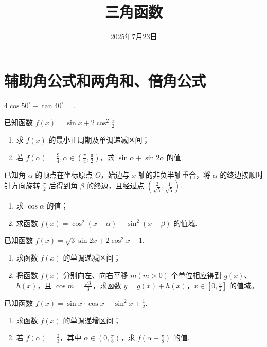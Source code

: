 \documentclass[a4paper , final]{ctexart}
\title{三角函数}
\date{2025年7月23日}
\newenvironment{problem}[1]{%
  \item #1
  \par
  \vspace{8cm}
}{}
\begin{document}
\maketitle

\section*{辅助角公式和两角和、倍角公式}

\begin{problems}
  \begin{problem}
        {
            $4\cos{50^\circ}-\tan{40^\circ}=$\underline{\hspace{1.5cm}}.
        }
    \end{problem}
  \begin{problem}
    {
      已知函数 $f(x) = \sin x +2\cos^2\frac{x}{2}$.
      \begin{enumerate}[label=(\arabic*)]
        \item 求 $f(x)$ 的最小正周期及单调递减区间；
        \item 若 $f(\alpha)=\frac94,\alpha\in(\frac{\pi}{4},\frac{\pi}{2})$，求 $\sin\alpha+\sin 2\alpha$ 的值.
      \end{enumerate}
    }
  \end{problem}

  \begin{problem}
    {
      已知角 $\alpha$ 的顶点在坐标原点 $O$，始边与 $x$ 轴的非负半轴重合，将 $\alpha$ 的终边按顺时针方向旋转 $\frac{\pi}{2}$ 后得到角 $\beta$ 的终边，且经过点 $(\frac{2}{\sqrt{5}}, \frac{1}{\sqrt{5}})$.
      \begin{enumerate}[label=(\arabic*)]
        \item 求 $\cos \alpha$ 的值；
        \item 求函数 $f(x) = \cos^2(x-\alpha) + \sin^2(x+\beta)$ 的值域.
      \end{enumerate}
    }
  \end{problem}

  \begin{problem}
    {
      已知函数 $f(x) = \sqrt{3} \sin 2x + 2\cos^2 x - 1$.
      \begin{enumerate}[label=(\arabic*)]
        \item 求函数 $f(x)$ 的单调递减区间；
        \item 将函数 $f(x)$ 分别向左、向右平移 $m(m>0)$ 个单位相应得到 $g(x)$、$h(x)$，且 $\cos m = \frac{\sqrt{3}}{3}  $，求函数 $y = g(x) + h(x)$，$x \in [0, \frac{\pi}{2}]$ 的值域。
      \end{enumerate}
    }
\end{problem}
\newpage
\begin{problem}
  {
    已知函数 $f(x) = \sin x \cdot \cos x - \sin^2 x + \frac{1}{2}$.
    \begin{enumerate}[label=(\arabic*)]
      \item 求函数 $f(x)$ 的单调递增区间；
      \item 若 $f(\alpha) = \frac{2}{3}$，其中 $\alpha \in \left(0, \frac{\pi}{8}\right)$，求 $f\left(\alpha + \frac{\pi}{8}\right)$ 的值.
    \end{enumerate}
  }
\end{problem}


\end{problems}
\end{document}
